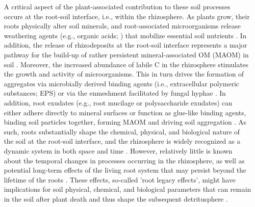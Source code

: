 A critical aspect of the plant-associated contribution to these soil processes occurs at the root-soil interface, i.e., within the rhizosphere. As plants grow, their roots physically alter soil minerals, and root-associated microorganisms release weathering agents (e.g., organic acids; \citep{Uroz2009}) that mobilize essential soil nutrients \citep{Gregory2022}. 
In addition, the release of rhizodeposits at the root-soil interface represents a major pathway for the build-up of rather persistent mineral-associated OM (MAOM) in soil \citep{Sokol2019, Villarino2021}. Moreover, the increased abundance of labile C in the rhizosphere stimulates the growth and activity of microorganisms. This in turn drives the formation of aggregates via microbially derived binding agents (i.e., extracellular polymeric substances; EPS) or via the enmeshment facilitated by fungal hyphae \citep{Chenu2011, Costa2018}. In addition, root exudates (e.g., root mucilage or polysaccharide exudates) can either adhere directly to mineral surfaces or function as glue-like binding agents, binding soil particles together, forming MAOM \citep{Roetzer2023} and driving soil aggregation \citep{Baumert2018}. As such, roots substantially shape the chemical, physical, and biological nature of the soil at the root-soil interface, and the rhizosphere is widely recognized as a dynamic system in both space and time \citep{Jones2009, Hinsinger2009, Kuzyakov2019}. However, relatively little is known about the temporal changes in processes occurring in the rhizosphere, as well as potential long-term effects of the living root system that may persist beyond the lifetime of the roots \citep{Oliver2021}. These effects, so-called 'root legacy effects', might have implications for soil physical, chemical, and biological parameters that can remain in the soil after plant death and thus shape the subsequent detritusphere \citep{Wurst2015}.

